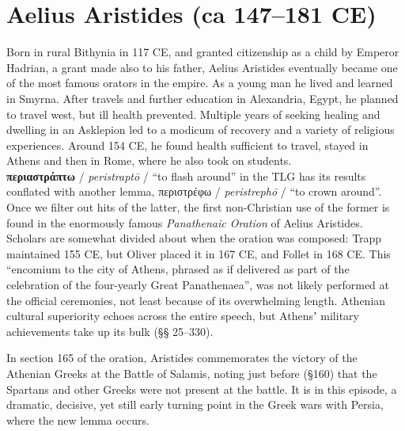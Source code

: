 %
%
\chapter{Aelius Aristides (ca 147--181 CE)}%
\vspace*{3mm} %
\justifying %

\noindent{}Born in rural Bithynia in 117 CE, and granted citizenship as a child by Emperor Hadrian, %
a grant made also to his father, %
Aelius Aristides eventually became one of the most famous orators in the empire. %
As a young man he lived and learned in Smyrna. %
After travels and further education in Alexandria, Egypt, %
he planned to travel west, %
but ill health prevented. %
Multiple years of seeking healing and dwelling in an Asklepion led to a modicum of recovery %
and a variety of religious experiences. %
Around 154 CE, he found health sufficient to travel, %
stayed in Athens and then in Rome, %
where he also took on students. \\[1.5mm] %

\noindent{}\textbf{περιαστράπτω} / \textit{peristraptō} / “to flash around” in the TLG %
has its results conflated with another lemma, περιστρέφω / \textit{peristrephō} / “to crown around”. %
Once we filter out hits of the latter, %
the first non-Christian use of the former is found in the enormously famous %
\textit{Panathenaic Oration} of Aelius Aristides. %
Scholars are somewhat divided about when the oration was composed: %
Trapp maintained 155 CE, but Oliver placed it in 167 CE, %
and Follet in 168 CE. %
This “encomium to the city of Athens, phrased as if delivered as part of the celebration %
of the four-yearly Great Panathenaea”, %
was not likely performed at the official ceremonies, %
not least because of its overwhelming length. %
Athenian cultural superiority echoes across the entire speech, %
but Athensʼ military achievements take up its bulk (§§ 25--330). %

In section 165 of the oration, %
Aristides commemorates the victory of the Athenian Greeks at the Battle of Salamis, %
noting just before (§160) that the Spartans and other Greeks were not present at the battle. %
It is in this episode, a dramatic, decisive, yet still early turning point in the Greek wars with Persia, %
where the new lemma occurs. %

